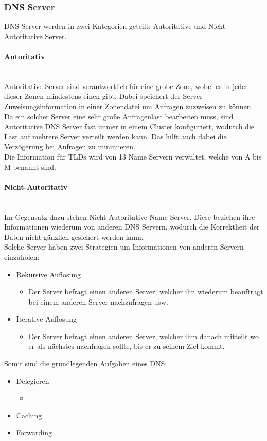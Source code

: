 \documentclass{article}
\newcommand{\paragraphlb}[1]{\paragraph{#1}\mbox{}\\}
\begin{document}
	 \subsubsection{DNS Server}
	 DNS Server werden in zwei Kategorien geteilt: Autoritative und Nicht-Autoritative Server. \\
	 \paragraphlb{Autoritativ}
	 Autoritative Server sind verantwortlich für eine grobe Zone, wobei es in jeder dieser Zonen mindestens einen gibt. Dabei speichert der Server Zuweisungsinformation in einer Zonendatei um Anfragen zuzweisen zu können. Da ein solcher Server eine sehr große Anfragenlast bearbeiten muss, sind Autoritative DNS Server fast immer in einem Cluster konfiguriert, wodurch die Last auf mehrere Server verteilt werden kann. Das hilft auch dabei die Verzögerung bei Anfragen zu minimieren. \\
	 Die Information für TLDs wird von 13 Name Servern verwaltet, welche von A bis M benannt sind.
	 \paragraphlb{Nicht-Autoritativ}
	 Im Gegensatz dazu stehen Nicht Autoritative Name Server. Diese beziehen ihre Informationen wiederum von anderen DNS Servern, wodurch die Korrektheit der Daten nicht gänzlich gesichert werden kann. \\
	 Solche Server haben zwei Strategien um Informationen von anderen Servern einzuholen:
	 \begin{itemize}
	 	\item{Rekursive Auflösung}
	 	\begin{itemize}
	 		\item{Der Server befragt einen anderen Server, welcher ihn wiederum beauftragt bei einem anderen Server nachzufragen usw.}
	 	\end{itemize}
	 	\item{Iterative Auflösung}
	 	\begin{itemize}
	 		\item{Der Server befragt einen anderen Server, welcher ihm danach mitteilt wo er als nächstes nachfragen sollte, bis er zu seinem Ziel kommt.}
	 	\end{itemize}
	 \end{itemize}
	 Somit sind die grundlegenden Aufgaben eines DNS:
	 \begin{itemize}
	 	\item{Delegieren}
	 	\begin{itemize}
	 		\item{}
	 	\end{itemize}
	 	\item{Caching}
	 	\item{Forwarding}
	 \end{itemize}
\end{document}
